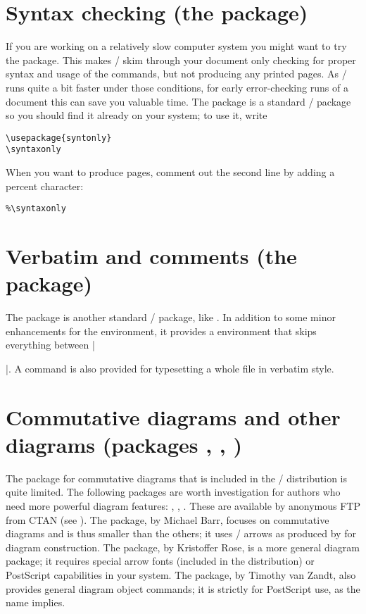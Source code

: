 \documentclass[leqno,titlepage,openany]{amsldoc}
\newcommand{\ii}[1]{#1\index{#1}}
\begin{document}
\section{Syntax checking (the  package)}

If you are working on a relatively slow computer system you might want
to try the  package. This makes \latex/ skim through your
document only checking for proper syntax and usage of the commands, but
not producing any printed pages. As \latex/ runs quite a bit faster
under those conditions, for early error-checking runs of a document this
can save you valuable time. The  package is a
standard \latex/ package so you should find it already on your system;
to use it, write
\begin{verbatim}
\usepackage{syntonly}
\syntaxonly
\end{verbatim}
When you want to produce pages, comment out the second line by adding a
percent character:
\begin{verbatim}
%\syntaxonly
\end{verbatim}

\section{Verbatim and comments (the  package)}

The  package is another standard \latex/ package, like
. In addition to some minor enhancements for the
 environment, it provides a  environment that
skips everything between |\begin{comment}| and the next
|\end{comment}|. A command  is also provided for
typesetting a whole file in verbatim style.

\section{Commutative diagrams and other diagrams (packages ,
, )}\label{xypic}

The  package for \ii{commutative diagrams} that is included
in the \amslatex/ distribution is quite limited. The following packages
are worth investigation for authors who need more powerful diagram
features: , , . These are
available by anonymous FTP from CTAN (see
). The  package, by Michael Barr, focuses on
commutative diagrams and is thus smaller than the others; it uses
\latex/ arrows as produced by  for diagram construction. The
 package, by Kristoffer Rose, is a more general diagram
package; it requires special arrow fonts (included in the 
distribution) or PostScript capabilities in your system. The
 package, by Timothy van Zandt, also provides general
diagram object commands; it is strictly for PostScript use, as the name
implies.
\end{document}
